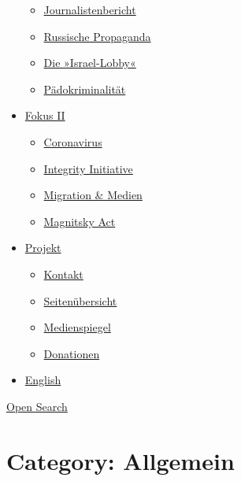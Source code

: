 \begin{itemize}
  \begin{itemize}
  \tightlist
  \item
    \href{https://swprs.org/bericht-eines-journalisten/}{Journalistenbericht}
  \item
    \href{https://swprs.org/russische-propaganda/}{Russische Propaganda}
  \item
    \href{https://swprs.org/die-israel-lobby-fakten-und-mythen/}{Die
    »Israel-Lobby«}
  \item
    \href{https://swprs.org/geopolitik-und-paedokriminalitaet/}{Pädokriminalität}
  \end{itemize}
\item
  \href{https://swprs.org/migration-und-medien/}{Fokus II}

  \begin{itemize}
  \tightlist
  \item
    \href{https://swprs.org/covid-19-hinweis-ii/}{Coronavirus}
  \item
    \href{https://swprs.org/die-integrity-initiative/}{Integrity
    Initiative}
  \item
    \href{https://swprs.org/migration-und-medien/}{Migration \& Medien}
  \item
    \href{https://swprs.org/der-fall-magnitsky/}{Magnitsky Act}
  \end{itemize}
\item
  \href{https://swprs.org/kontakt/}{Projekt}

  \begin{itemize}
  \tightlist
  \item
    \href{https://swprs.org/kontakt/}{Kontakt}
  \item
    \href{https://swprs.org/uebersicht/}{Seitenübersicht}
  \item
    \href{https://swprs.org/medienspiegel/}{Medienspiegel}
  \item
    \href{https://swprs.org/donationen/}{Donationen}
  \end{itemize}
\item
  \href{https://swprs.org/contact/}{English}
\end{itemize}

\protect\hyperlink{}{Open Search}

\hypertarget{category-allgemein}{%
\section{Category: Allgemein}\label{category-allgemein}}

